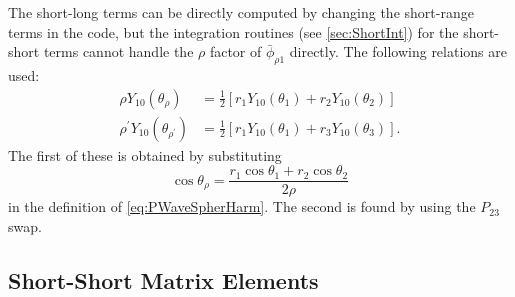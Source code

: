 \documentclass[Dissertation.tex]{subfiles}
\begin{document}
The short-long terms can be directly computed by changing the short-range terms
in the code, but the integration routines (see \cref{sec:ShortInt}) for the
short-short terms cannot handle the $\rho$ factor of $\bar{\phi}_{\rho 1}$
directly. The following relations are used:
\begin{subequations}
\label{eq:P2rhoY10}
\begin{align}
\rho Y_{10}(\theta_\rho) &= \frac{1}{2}\left[ r_1 Y_{10}(\theta_1) + r_2 Y_{10}(\theta_2) \right] \\
\rho^\prime Y_{10}(\theta_{\rho^\prime}) &= \frac{1}{2}\left[ r_1 Y_{10}(\theta_1) + r_3 Y_{10}(\theta_3) \right].
\end{align}
\end{subequations}
The first of these is obtained by substituting
\begin{equation}
\label{eq:CosRho}
\cos\theta_\rho = \frac{r_1 \cos\theta_1 + r_2 \cos\theta_2}{2\rho}
\end{equation}
in the definition of \cref{eq:PWaveSpherHarm}. The second is found by using the $P_{23}$ swap.


\subsection{Short-Short Matrix Elements}
\label{sec:PWave2ndShortShort}
\end{document}
